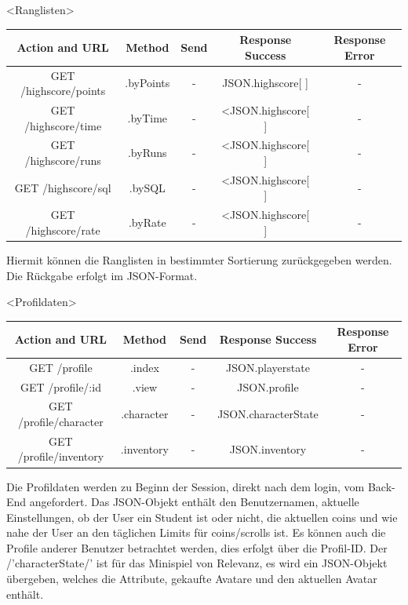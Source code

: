 \newpage
\begin{interface}{50}{<Ranglisten>}

\begin{center}
	\begin{tabular}[h]{|c|c|c|c|c|}
	\hline
	\textbf{Action and URL} &\textbf {Method} &\textbf {Send} &\textbf {Response Success} & \textbf{Response Error}\\
	\hline
	GET     /highscore/points & .byPoints & - & JSON.highscore[ ]  & - \\
	\hline
	\hline
	GET     /highscore/time & .byTime & - & <JSON.highscore[ ] & - \\
	\hline
	\hline
	GET     /highscore/runs & .byRuns & -  & <JSON.highscore[ ] & - \\
	\hline
	\hline
	GET     /highscore/sql & .bySQL & - & <JSON.highscore[ ] & - \\
	\hline
	\hline
	GET     /highscore/rate & .byRate & - & <JSON.highscore[ ] & - \\
	\hline
	 \end{tabular}
\end{center}

\end{interface}

Hiermit können die Ranglisten in bestimmter Sortierung zurückgegeben werden. Die Rückgabe erfolgt im JSON-Format.

\begin{interface}{60}{<Profildaten>}

\begin{center}
	\begin{tabular}[h]{|c|c|c|c|c|}
	\hline
	\textbf{Action and URL} &\textbf {Method} &\textbf {Send} &\textbf {Response Success} & \textbf{Response Error}\\
	\hline
	GET     /profile & .index & - & JSON.playerstate & - \\
	\hline
	\hline
	GET     /profile/:id & .view & - & JSON.profile & - \\
	\hline
	\hline
	GET     /profile/character & .character & - & JSON.characterState  & - \\
	\hline
	\hline
	GET     /profile/inventory & .inventory & - & JSON.inventory & - \\
	\hline
	 \end{tabular}
\end{center}

\end{interface}

Die Profildaten werden zu Beginn der Session, direkt nach dem login, vom Back-End angefordert. Das JSON-Objekt enthält den Benutzernamen, aktuelle Einstellungen, ob der User ein Student ist oder nicht, die aktuellen coins und wie nahe der User an den täglichen Limits für coins/scrolls ist.
Es können auch die Profile anderer Benutzer betrachtet werden, dies erfolgt über die Profil-ID.
Der /'characterState/' ist für das Minispiel von Relevanz, es wird ein JSON-Objekt übergeben, welches die Attribute, gekaufte Avatare und den aktuellen Avatar enthält.


